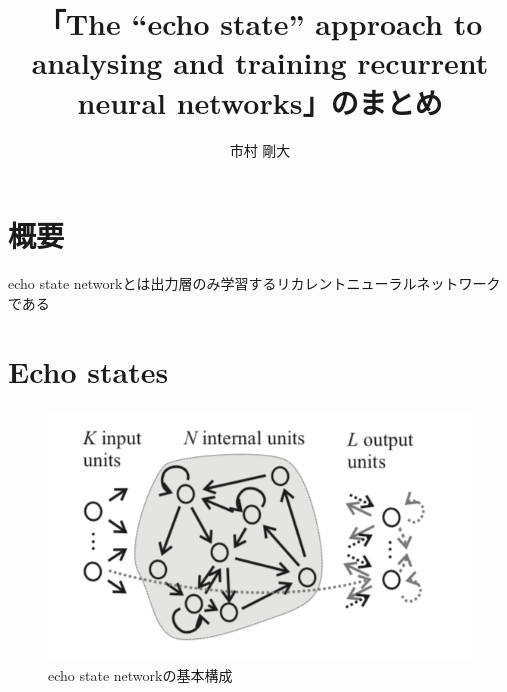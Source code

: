 \documentclass{jsarticle}
\begin{document}
\title{「The “echo state” approach to analysing and training recurrent neural networks」のまとめ}
\author{市村 剛大}
\maketitle

\section*{概要}
echo state networkとは出力層のみ学習するリカレントニューラルネットワークである

\section{Echo states}

\begin{figure}[htbp]
  \centering
  \includegraphics[width=0.5\hsize]{./figures/esn.png}
  \caption{echo state networkの基本構成}
  \label{fig:basic_structure}
\end{figure}
\end{document}
